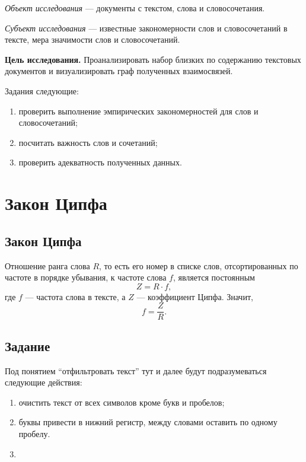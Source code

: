 \textit{Объект исследования} --- документы с текстом, слова и словосочетания.

\textit{Субъект исследования} --- известные закономерности слов и словосочетаний
в тексте, мера значимости слов и словосочетаний.

\textbf{Цель исследования.}
Проанализировать набор близких по содержанию текстовых документов
и визуализировать граф полученных взаимосвязей.

Задания следующие:
\begin{enumerate}
  \item 
    проверить выполнение эмпирических закономерностей для слов и словосочетаний;
  \item
    посчитать важность слов и сочетаний;
  \item
    проверить адекватность полученных данных.
\end{enumerate}

\chapter{Закон Ципфа}

\section{Закон Ципфа}
Отношение ранга слова $R$, то есть его номер в списке слов,
отсортированных по частоте в порядке убывания, к частоте слова $f$,
является постоянным \cite{JeanBaptiste}
\begin{equation*}
  Z = R \cdot f,
\end{equation*}
где $f$ --- частота слова в тексте, а $Z$ --- коэффициент Ципфа.
Значит,
\begin{equation*}
  f = \frac{Z}{R}.
\end{equation*}

\section{Задание}

Под понятием ``отфильтровать текст'' тут и далее будут подразумеваться
следующие действия:
\begin{enumerate}
  \item
    очистить текст от всех символов кроме букв и пробелов;
  \item
    буквы привести в нижний регистр, между словами оставить по одному пробелу.
  \item
\end{enumerate}

